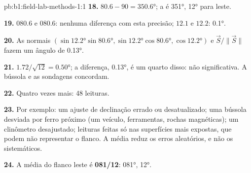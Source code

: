 \begin{solution}{pb:b1:field-lab-methods-1:1}
\textbf{18.} $80.6 - 90 = \ang{350.6}$; a  é  \ang{351},  \ang{12} para leste.

\textbf{19.}  $080.6$ e $080.6$: nenhuma diferença com esta precisão;  $12.1$ e $12.2$: \ang{0.1}.

\textbf{20.} As normais $(\sin\ang{12.2}\sin\ang{80.6},
\sin\ang{12.2}\cos\ang{80.6}, \cos\ang{12.2})$ e $\vec S/\|\vec S\|$ fazem
um ângulo de \ang{0.13}.

\textbf{21.} $1.72/\sqrt{12} = \ang{0.50}$; a diferença, \ang{0.13}, é um quarto disso: não significativa. A bússola e as sondagens concordam.

\textbf{22.} Quatro vezes mais: 48 leituras.

\textbf{23.} Por exemplo: um ajuste de declinação errado ou desatualizado; uma bússola desviada por ferro próximo (um veículo, ferramentas, rochas magnéticas); um clinômetro desajustado; leituras feitas só nas superfícies mais expostas, que podem não representar o flanco. A média reduz os erros aleatórios, e não os sistemáticos.

\textbf{24.} A  média do flanco leste é \textbf{081/12}: 
\ang{081},  \ang{12}.
\end{solution}
